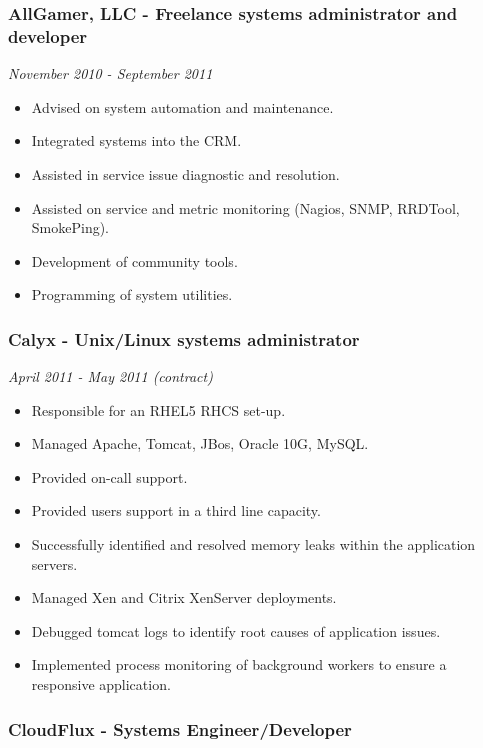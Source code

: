 \subsubsection{AllGamer, LLC - Freelance systems administrator and
developer}\label{allgamer-llc---freelance-systems-administrator-and-developer}

\emph{November 2010 - September 2011}

\begin{itemize}
\tightlist
\item
  Advised on system automation and maintenance.
\item
  Integrated systems into the CRM.
\item
  Assisted in service issue diagnostic and resolution.
\item
  Assisted on service and metric monitoring (Nagios, SNMP, RRDTool,
  SmokePing).
\item
  Development of community tools.
\item
  Programming of system utilities.
\end{itemize}

\subsubsection{Calyx - Unix/Linux systems
administrator}\label{calyx---unixlinux-systems-administrator}

\emph{April 2011 - May 2011 (contract)}

\begin{itemize}
\tightlist
\item
  Responsible for an RHEL5 RHCS set-up.
\item
  Managed Apache, Tomcat, JBos, Oracle 10G, MySQL.
\item
  Provided on-call support.
\item
  Provided users support in a third line capacity.
\item
  Successfully identified and resolved memory leaks within the
  application servers.
\item
  Managed Xen and Citrix XenServer deployments.
\item
  Debugged tomcat logs to identify root causes of application issues.
\item
  Implemented process monitoring of background workers to ensure a
  responsive application.
\end{itemize}

\subsubsection{CloudFlux - Systems
Engineer/Developer}\label{cloudflux---systems-engineerdeveloper}

